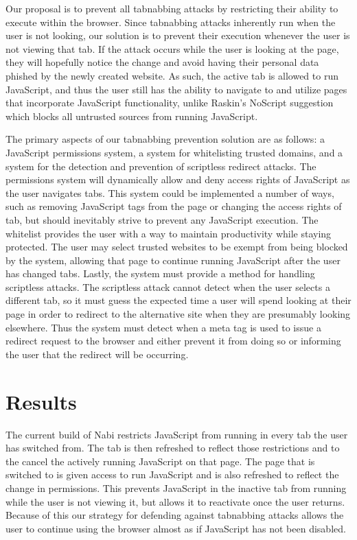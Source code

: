 \documentclass[12pt]{article}
\begin{document}
\begin{doublespace}
Our proposal is to prevent all tabnabbing attacks by restricting their ability to execute within the browser. Since tabnabbing attacks inherently run when the user is not looking, our solution is to prevent their execution whenever the user is not viewing that tab. If the attack occurs while the user is looking at the page, they will hopefully notice the change and avoid having their personal data phished by the newly created website. As such, the active tab is allowed to run JavaScript, and thus the user still has the ability to navigate to and utilize pages that incorporate JavaScript functionality, unlike Raskin's NoScript suggestion which blocks all untrusted sources from running JavaScript.

The primary aspects of our tabnabbing prevention solution are as follows: a JavaScript permissions system, a system for whitelisting trusted domains, and a system for the detection and prevention of scriptless redirect attacks. The permissions system will dynamically allow and deny access rights of JavaScript as the user navigates tabs. This system could be implemented a number of ways, such as removing JavaScript tags from the page or changing the access rights of tab, but should inevitably strive to prevent any JavaScript execution. The whitelist provides the user with a way to maintain productivity while staying protected. The user may select trusted websites to be exempt from being blocked by the system, allowing that page to continue running JavaScript after the user has changed tabs. Lastly, the system must provide a method for handling scriptless attacks. The scriptless attack cannot detect when the user selects a different tab, so it must guess the expected time a user will spend looking at their page in order to redirect to the alternative site when they are presumably looking elsewhere. Thus the system must detect when a meta tag is used to issue a redirect request to the browser and either prevent it from doing so or informing the user that the redirect will be occurring.

\section{Results}
The current build of Nabi restricts JavaScript from running in every tab the user has switched from. The tab is then refreshed to reflect those restrictions and to the cancel the actively running JavaScript on that page. The page that is switched to is given access to run JavaScript and is also refreshed to reflect the change in permissions. This prevents JavaScript in the inactive tab from running while the user is not viewing it, but allows it to reactivate once the user returns. Because of this our strategy for defending against tabnabbing attacks allows the user to continue using the browser almost as if JavaScript has not been disabled.


\end{doublespace}
\end{document}
